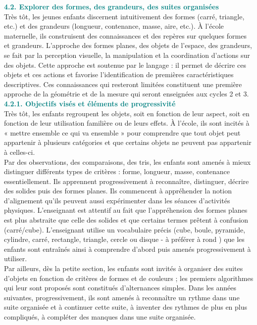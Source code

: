 {\begin{center}
   \begin{minipage}{15cm}
      \textsf{{\textcolor{teal}{\bf 4.2. Explorer des formes, des grandeurs, des suites organisées}} \\ [1mm]
      Très tôt, les jeunes enfants discernent intuitivement des formes (carré, triangle, etc.) et des grandeurs (longueur, contenance, masse, aire, etc.). À l’école maternelle, ils construisent des connaissances et des repères sur quelques formes et grandeurs. L’approche des formes planes, des objets de l’espace, des grandeurs, se fait par la perception visuelle, la manipulation et la coordination d’actions sur des objets. Cette approche est soutenue par le langage : il permet de décrire ces objets et ces actions et favorise l’identification de premières caractéristiques descriptives. Ces connaissances qui resteront limitées constituent une première approche de la géométrie et de la mesure qui seront enseignées aux cycles 2 et 3. \\ [3mm]
      {\bf\textcolor{teal}{4.2.1. Objectifs visés et éléments de progressivité}} \\ [1mm]
      Très tôt, les enfants regroupent les objets, soit en fonction de leur aspect, soit en fonction de leur utilisation familière ou de leurs effets. À l’école, ils sont incités à « mettre ensemble ce qui va ensemble » pour comprendre que tout objet peut appartenir à plusieurs catégories et que certains objets ne peuvent pas appartenir à celles-ci. \\
      Par des observations, des comparaisons, des tris, les enfants sont amenés à mieux distinguer différents types de critères : forme, longueur, masse, contenance essentiellement. Ils apprennent progressivement à reconnaître, distinguer, décrire des solides puis des formes planes. Ils commencent à appréhender la notion d’alignement qu’ils peuvent aussi expérimenter dans les séances d’activités physiques. L’enseignant est attentif au fait que l’appréhension des formes planes est plus abstraite que celle des solides et que certains termes prêtent à confusion (carré/cube). L’enseignant utilise un vocabulaire précis (cube, boule, pyramide, cylindre, carré, rectangle, triangle, cercle ou disque - à préférer à \og rond \fg) que les enfants sont entraînés ainsi à comprendre d’abord puis amenés progressivement à utiliser. \\
      Par ailleurs, dès la petite section, les enfants sont invités à organiser des suites d’objets en fonction de critères de formes et de couleurs ; les premiers algorithmes qui leur sont proposés sont constitués d’alternances simples. Dans les années suivantes, progressivement, ils sont amenés à reconnaître un rythme dans une suite organisée et à continuer cette suite, à inventer des \og rythmes \fg{} de plus en plus compliqués, à compléter des manques dans une suite organisée.}
   \end{minipage}
\end{center}

}
